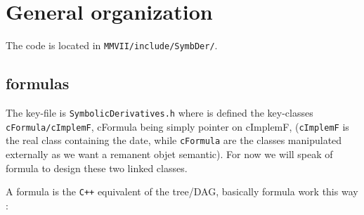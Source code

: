 \section{General organization}


The code is located in  {\tt MMVII/include/SymbDer/}.

\subsection{formulas}

The key-file is {\tt SymbolicDerivatives.h}  where is defined   the key-classes   {\tt cFormula/cImplemF},
cFormula being simply pointer on cImplemF,  ({\tt cImplemF} is the real class containing the date, while
{\tt cFormula} are the classes manipulated externally as we want a remanent objet  semantic).
For now we will speak of formula to design these two linked classes.


A formula is the {\tt C++} equivalent of the tree/DAG, basically formula work this way :

